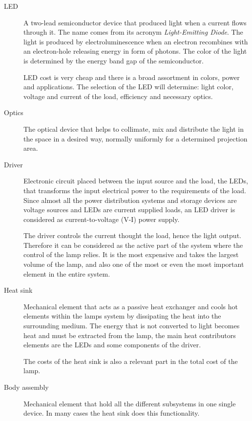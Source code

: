 \begin{description}
  \item[LED] A two-lead semiconductor device that produced light when a current flows through it. The name comes from its acronym \emph{Light-Emitting Diode}. The light is produced by electroluminescence when an electron recombines with an electron-hole releasing energy in form of photons. The color of the light is determined by the energy band gap of the semiconductor.  
      
   LED cost is very cheap and there is a broad assortment in colors, power and applications. The selection of the LED will determine: light color, voltage and current of the load, efficiency and necessary optics. 
         
  \item[Optics] The optical device that helps to collimate, mix and distribute the light in the space in a desired way, normally uniformly for a determined projection area.  
     
  \item[Driver] Electronic circuit placed between the input source and the load, the LEDs, that transforms the input electrical power to the requirements of the load. Since almost all the power distribution systems and storage devices are voltage sources and LEDs are current supplied loads, an LED driver is considered as current-to-voltage (V-I) power supply. 
      
      The driver controls the current thought the load, hence the light output. Therefore it can be considered as the active part of the system where the control of the lamp relies. It is the most expensive and takes the largest volume of the lamp, and also one of the most or even the most important element in the entire system.
  
  \item[Heat sink] Mechanical element that acts as a passive heat exchanger and cools hot elements within the lamps system by dissipating the heat into the surrounding medium. The energy that is not converted to light becomes heat and must be extracted from the lamp, the main heat contributors elements are the LEDs and some components of the driver.
      
      The costs of the heat sink is also a relevant part in the total cost of the lamp.    
      
  \item[Body assembly] Mechanical element that hold all the different subsystems in one single device. In many cases the heat sink does this functionality. 
  

\end{description}

